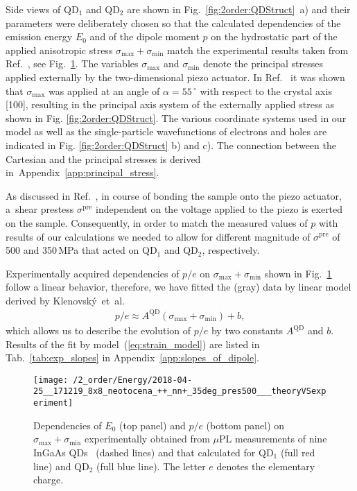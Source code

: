 Side views of QD$_1$ and QD$_2$ are shown in Fig.~\ref{fig:2order:QDStruct}~a) and their parameters were deliberately chosen so that the calculated dependencies of the emission energy $E_0$ and of the dipole moment $p$ on the hydrostatic part of the applied anisotropic stress $\sigma_{\mathrm{max}}+\sigma_{\mathrm{min}}$ match the experimental results taken from Ref.~\cite{Aberl:17}, see Fig.~\ref{fig:TheorVsExp}. The variables $\sigma_{\mathrm{max}}$ and $\sigma_{\mathrm{min}}$ denote the principal stresses~\cite{Trotta:15} applied externally by the two-dimensional piezo actuator. In  Ref.~\citep{Aberl:17} it was shown that $\sigma_{\mathrm{max}}$ was applied at an angle of $\alpha=55\,^{\circ}$ with respect to the crystal axis [100], resulting in the principal axis system of the externally applied stress as shown in Fig. \ref{fig:2order:QDStruct}. The various coordinate systems used in our model as well as the single-particle wavefunctions of electrons and holes are indicated in Fig. \ref{fig:2order:QDStruct} b) and c). The connection between the Cartesian and the principal stresses is derived in~Appendix~\ref{app:principal_stress}.

As discussed in Ref.~\cite{Aberl:17}, in course of bonding the sample onto the piezo actuator, a~shear prestess $\sigma^\text{pre}$ independent on the voltage applied to the piezo is exerted on the sample. Consequently, in order to match the measured values of $p$ with results of our calculations we needed to allow for different magnitude of $\sigma^\text{pre}$ of 500 and 350$\,$MPa that acted on QD$_1$ and QD$_2$, respectively.

Experimentally acquired dependencies of $p/e$ on $\sigma_{\mathrm{max}}+\sigma_{\mathrm{min}}$ shown in Fig.~\ref{fig:TheorVsExp} follow a linear behavior, therefore, we have fitted the (gray) data by linear model derived by {Kle\-no\-vský~et~al.}~\cite{Klenovsky_2018_InGaAs_straintuned}
%
\begin{eqnarray}
p/e\approx A^{\mathrm{QD}}\left(\sigma_\mathrm{max}+\sigma_\mathrm{min}\right)+b, \label{eq:strain_model}
\end{eqnarray}
%
which allows us to describe the evolution of $p/e$ by two constants $A^{\mathrm{QD}}$ and $b$. Results of the fit by model~(\ref{eq:strain_model}) are listed in Tab.~\ref{tab:exp_slopes} in Appendix~\ref{app:slopes_of_dipole}.

%


\begin{figure}[!ht]
	\centering
	\renewcommand{\tabcolsep}{2pt}
	\texttt{[image: /2\_order/Energy/2018-04-25\_\_171219\_8x8\_neotocena\_++\_nn+\_35deg\_pres500\_\_\_theoryVSexperiment]} 
	\caption{
		Dependencies of $E_0$ (top panel) and $p/e$ (bottom panel) on $\sigma_{\mathrm{max}}+\sigma_{\mathrm{min}}$ experimentally obtained from $\mu$PL measurements of nine InGaAs QDs~\cite{Aberl:17} (dashed lines) and that calculated for QD$_1$ (full red line) and QD$_2$ (full blue line). The letter $e$ denotes the elementary charge.}
	\label{fig:TheorVsExp}
\end{figure}


